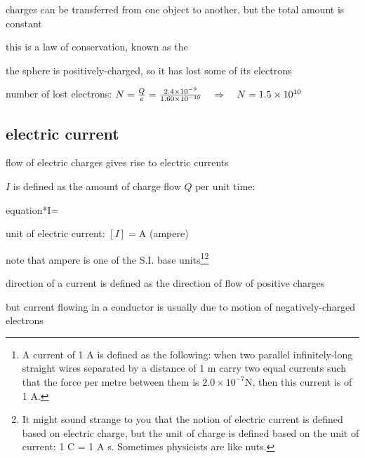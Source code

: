 charges can be transferred from one object to another, but the total amount is constant

this is a law of conservation, known as the 



\begin{soln} the sphere is positively-charged, so it has lost some of its electrons

number of lost electrons: $ N = \frac{Q}{e} = \frac{2.4\times10^{-9}}{1.60 \times10^{-19}} \quad \Rightarrow \quad N = 1.5 \times 10^{10}  $ \end{soln}



\subsection{electric current}

flow of electric charges gives rise to electric currents

\begin{ilight}
	\centering {} $I$ is defined as the amount of charge flow $Q$ per unit time: \begin{empheq}[box=\tcbhighmath]{equation*}{I=}\end{empheq}
\end{ilight}


\cmt unit of electric current: $[I] = \text{A}$ (ampere)

note that ampere is one of the S.I. base units\footnote{A current of 1 A is defined as the following: when two parallel infinitely-long straight wires separated by a distance of 1 m carry two equal currents such that the force per metre between them is $2.0\times10^{-7}$N, then this current is of 1 A.}\footnote{It might sound strange to you that the notion of electric current is defined based on electric charge, but the unit of charge is defined based on the unit of current: 1 C = 1 A s. Sometimes physicists are like nuts.}

\cmt direction of a current is defined as the direction of flow of positive charges

but current flowing in a conductor is usually due to motion of negatively-charged electrons

